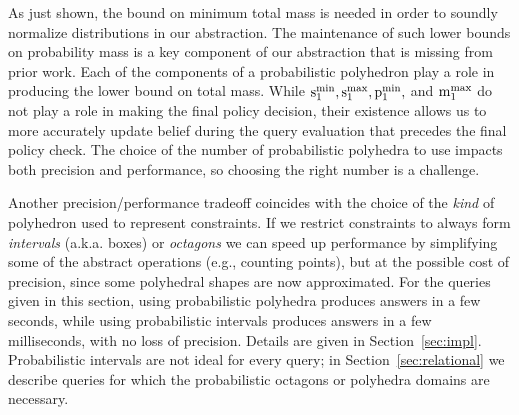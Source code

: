 As just shown, the bound on minimum total mass is needed in order to soundly
normalize distributions in our abstraction.  The maintenance of such lower
bounds on probability mass is a key component of our abstraction that is
missing from prior work.  Each of the components of a probabilistic
polyhedron play a role in producing the lower bound on total mass.  While
$\mathrm{s}^\mathrm{min}_{1}, \mathrm{s}^\mathrm{max}_{1}, \mathrm{p}^\mathrm{min}_{1},$ and $\mathrm{m}^\mathrm{max}_{1}$ do not play a role in making
the final policy decision, their existence allows us to more accurately
update belief during the query evaluation that precedes the final policy
check.  The choice of the number of probabilistic polyhedra to
use impacts both precision and performance, so choosing the right number is
a challenge.  

Another precision/performance tradeoff coincides with the choice of
the \emph{kind} of polyhedron used to represent constraints.  If we
restrict constraints to always form \emph{intervals}
\cite{cousot76static} (a.k.a. boxes) or \emph{octagons}
\cite{mine01octagon} we can speed up performance by simplifying some
of the abstract operations (e.g., counting points), but at the
possible cost of precision, since some polyhedral shapes are now
approximated.  For the queries given in this section, using
probabilistic polyhedra produces answers in a few seconds, while using
probabilistic intervals produces answers in a few milliseconds, with
no loss of precision. Details are given in
Section~\ref{sec:impl}. Probabilistic intervals are not ideal for
every query; in Section~\ref{sec:relational} we describe queries for
which the probabilistic octagons or polyhedra domains are
necessary. 
